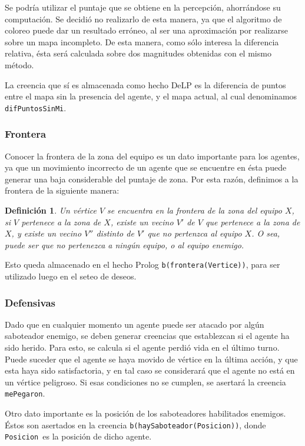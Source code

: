 \documentclass[oneside]{book}
\newtheorem{definicion}{Definición}
\begin{document}
Se podría utilizar el puntaje que se obtiene en la percepción, ahorrándose
su computación. Se decidió no realizarlo de esta manera, ya que el algoritmo de 
coloreo puede dar un resultado erróneo, al ser una aproximación por realizarse
sobre un mapa incompleto. De esta manera, como sólo interesa la diferencia 
relativa, ésta será calculada sobre dos magnitudes obtenidas con el mismo 
método.

La creencia que sí es almacenada como hecho DeLP es la diferencia de puntos entre
el mapa sin la presencia del agente, y el mapa actual, al cual denominamos
\texttt{difPuntosSinMi}.


\subsubsection{Frontera}

Conocer la frontera de la zona del equipo es un dato importante para los agentes,
ya que un movimiento incorrecto de un agente que se encuentre en ésta puede 
generar una baja considerable del puntaje de zona. Por esta razón, definimos a
la frontera de la siguiente manera:

\begin{definicion}
Un vértice $V$ se encuentra en la frontera de la zona del equipo $X$, si $V$ 
pertenece a la zona de $X$, existe un vecino $V'$ de $V$ que pertenece a la zona 
de $X$, y existe un vecino $V''$ distinto de $V'$ que no pertenzca al equipo $X$. 
O sea, puede ser que no pertenezca a ningún equipo, o al equipo enemigo.
\end{definicion}

Esto queda almacenado en el hecho Prolog \texttt{b(frontera(Vertice))}, para ser
utilizado luego en el seteo de deseos.


\subsubsection{Defensivas}

Dado que en cualquier momento un agente puede ser atacado por algún saboteador 
enemigo, se deben generar creencias que establezcan si el agente ha sido herido.
Para esto, se calcula si el agente perdió vida en el último turno. Puede suceder
que el agente se haya movido de vértice en la última acción, y que esta haya sido
satisfactoria, y en tal caso se considerará que el agente no está en un vértice
peligroso. Si esas condiciones no se cumplen, se asertará la creencia 
\texttt{mePegaron}.

Otro dato importante es la posición de los saboteadores habilitados enemigos.
Éstos son asertados en la creencia \texttt{b(haySaboteador(Posicion))}, donde 
\texttt{Posicion}\ es la posición de dicho agente.
\end{document}
